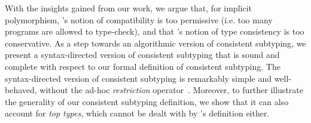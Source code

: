 \noindent With the insights gained from our work, we argue that, for implicit
polymorphism, \citeauthor{ahmed2011blame}'s notion of compatibility is too
permissive (i.e. too many programs are allowed to type-check), and that
\citeauthor{yuu2017poly}'s notion of type consistency is too conservative. As a
step towards an algorithmic version of consistent subtyping, we present a syntax-directed
version of consistent subtyping that is sound and complete with respect to our
formal definition of consistent subtyping. The syntax-directed version of
consistent subtyping is remarkably simple and well-behaved, without the ad-hoc \textit{restriction} operator~\citep{siek2007gradual}.
Moreover, to further illustrate the generality of our consistent
subtyping definition, we show that it can also account for \emph{top types},
which cannot be dealt with by \citeauthor{siek2007gradual}'s
definition either.






